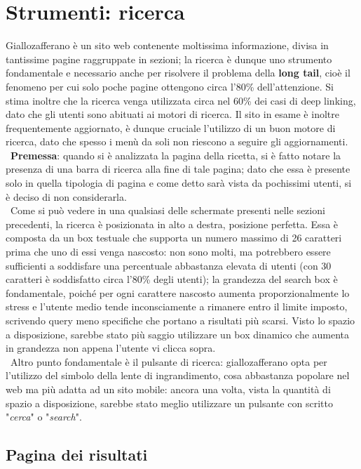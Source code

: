 \section{Strumenti: ricerca}
Giallozafferano è un sito web contenente moltissima informazione, divisa in tantissime pagine raggruppate in sezioni; la ricerca è dunque uno strumento fondamentale e necessario anche per risolvere il problema della \textbf{long tail}, cioè il fenomeno per cui solo poche pagine ottengono circa l'80\% dell'attenzione. Si stima inoltre che la ricerca venga utilizzata circa nel 60\% dei casi di deep linking, dato che gli utenti sono abituati ai motori di ricerca.
Il sito in esame è inoltre frequentemente aggiornato, è dunque cruciale l'utilizzo di un buon motore di ricerca, dato che spesso i menù da soli non riescono a seguire gli aggiornamenti.
\\~\textbf{Premessa}: quando si è analizzata la pagina della ricetta, si è fatto notare la presenza di una barra di ricerca alla fine di tale pagina; dato che essa è presente solo in quella tipologia di pagina e come detto sarà vista da pochissimi utenti, si è deciso di non considerarla.
\\~Come si può vedere in una qualsiasi delle schermate presenti nelle sezioni precedenti, la ricerca è posizionata in alto a destra, posizione perfetta. Essa è composta da un box testuale che supporta un numero massimo di 26 caratteri prima che uno di essi venga nascosto: non sono molti, ma potrebbero essere sufficienti a soddisfare una percentuale abbastanza elevata di utenti (con 30 caratteri è soddisfatto circa l'80\% degli utenti); la grandezza del search box è fondamentale, poiché per ogni carattere nascosto aumenta proporzionalmente lo stress e l'utente medio tende inconsciamente a rimanere entro il limite imposto, scrivendo query meno specifiche che portano a risultati più scarsi. Visto lo spazio a disposizione, sarebbe stato più saggio utilizzare un box dinamico che aumenta in grandezza non appena l'utente vi clicca sopra.
\\~Altro punto fondamentale è il pulsante di ricerca: giallozafferano opta per l'utilizzo del simbolo della lente di ingrandimento, cosa abbastanza popolare nel web ma più adatta ad un sito mobile: ancora una volta, vista la quantità di spazio a disposizione, sarebbe stato meglio utilizzare un pulsante con scritto "\textit{cerca}" o "\textit{search}".

\subsection{Pagina dei risultati}

